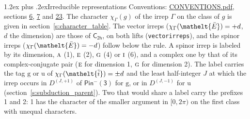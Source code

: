 \documentclass[10pt,a4paper]{article}
\makeatletter
\renewcommand\section{\@startsection{section}{1}{\z@}{-3ex plus -1ex minus -.2ex}%
  {1.2ex plus .2ex}{\normalfont\large\sffamily\bfseries\color{parttitle}}}
\numberwithin{equation}{section}
\newcommand{\eltfont}[1]{{\let\sigma\eltsigma\mathelt{#1}}}
\newcommand{\grp}[1]{\mathsf{#1}}
\newcommand{\irr}[1]{\text{\normalfont\scshape #1}}
\newcommand{\elt}[1]{\eltfont{#1}}
\newcommand{\ptag}[1]{\mathrm{#1}}
\newcommand{\irrJp}[2]{D^{(#1,#2)}}
\newcommand{\irchar}[1]{\chi_{#1}}
\newcommand{\barred}[1]{\bar{#1}}
\newcommand{\lift}[1]{\tilde{#1}}
\makeatother
\begin{document}
\section{Irreducible representations}\label{s:irreps}
Conventions: \href{../../CONVENTIONS.pdf}{CONVENTIONS.pdf}, sections \href{../../../rotation/CONVENTIONS.pdf\#conv.6}{6}, \href{../../../rotation/CONVENTIONS.pdf\#conv.7}{7} and \href{../../CONVENTIONS.pdf\#conv.23}{23}.
\leavevmode\label{n:function.character}\label{n:irrep.Gamma}The character $\irchar{\Gamma}(g)$ of the irrep $\Gamma$ on the class of $g$ is given in section~\ref{s:character_table}. \label{n:index.dimension}The vector irreps ($\irchar{\Gamma}(\elt{\barred{E}}) = +d$, $d$ the dimension) are those of \href{../../../rotation/data/pdf/C2h.pdf}{$\grp{C_{2h}}$}, on both lifts (\texttt{vectorirreps}), and the spinor irreps ($\irchar{\Gamma}(\elt{\barred{E}}) = -d$) follow below the rule. A spinor irrep is labeled by its dimension, $\irr{a}$ (1), $\irr{e}$ (2), $\irr{g}$ (4) or $\irr{i}$ (6), and a complex one by that of its complex-conjugate pair ($\irr{e}$ for dimension 1, $\irr{g}$ for dimension 2). The label carries the tag $\ptag{g}$ or $\ptag{u}$ of $\irchar{\Gamma}(\elt{\lift{i}}) = \pm d$ and the least half-integer $J$ at which the irrep occurs in $\irrJp{J}{+1}$ of $\grp{Pin^{-}(3)}$ for $\ptag{g}$, or in $\irrJp{J}{-1}$ for $\ptag{u}$ (section~\ref{s:subduction_parent}). Two that would share a label carry the prefixes 1 and 2: 1 has the character of the smaller argument in $[0, 2\pi)$ on the first class with unequal characters.
\end{document}
